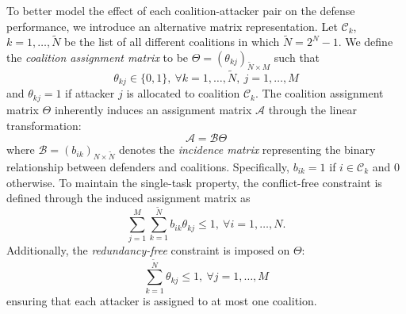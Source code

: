 \documentclass[journal]{IEEEtran}
\newcommand{\C}{\mathcal{C}}
\newcommand{\1}{\mathbf{1}}
\newcommand{\A}{\mathcal{A}}
\newcommand{\B}{\mathcal{B}}
\begin{document}
To better model the effect of each coalition-attacker pair on the defense performance, we introduce an alternative matrix representation. Let $\C_k$, $k=1,\ldots,\tilde{N}$ be the list of all different coalitions in which $\tilde{N}=2^{N}-1$. We define the \textit{coalition assignment matrix} to be $\Theta=(\theta_{kj})_{\tilde{N}\times M}$ such that
\begin{equation}\label{con:binary}
	\theta_{kj}\in \{0,1\},~\forall k=1,\ldots,\tilde{N},~j=1,\ldots,M
\end{equation}
and $\theta_{kj}=1$ if attacker $j$ is allocated to coalition $\C_k$. The coalition assignment matrix $\Theta$ inherently induces an assignment matrix $\A$ through the linear transformation:
\begin{equation}\label{mtx:inc}
    \A=\B\Theta
\end{equation}
where $\B=(b_{ik})_{N\times \tilde{N}}$ denotes the \textit{incidence matrix} representing the binary relationship between defenders and coalitions. Specifically, $b_{ik}=1$ if $i\in \C_k$ and 0 otherwise. To maintain the single-task property, the conflict-free constraint is defined through the induced assignment matrix as
\begin{equation}\label{con:cf}
	\sum_{j=1}^{M}\sum_{k=1}^{\tilde{N}}b_{ik}\theta_{kj}\leq 1,~\forall i=1,\ldots,N.
\end{equation}
Additionally, the \textit{redundancy-free} constraint is imposed on $\Theta$:
\begin{equation}\label{con:rf}
    \sum_{k=1}^{\tilde{N}}\theta_{kj}\leq 1,~\forall j=1,\ldots,M
\end{equation}
ensuring that each attacker is assigned to at most one coalition.
\end{document}
